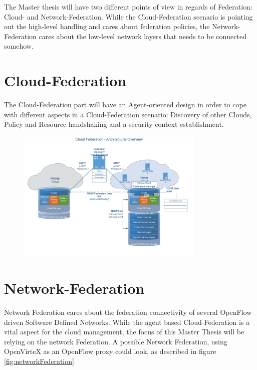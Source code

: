 \documentclass[a4paper,10pt]{article}
\begin{document}
The Master thesis will have two different points of view in regards of Federation: Cloud- and Network-Federation. While the Cloud-Federation scenario is pointing out the high-level handling and cares about federation policies, the Network-Federation cares about the low-level network layers that needs to be connected somehow.

\newpage
\section{Cloud-Federation}
The Cloud-Federation part will have an Agent-oriented design in order to cope with different aspects in a Cloud-Federation scenario: Discovery of other Clouds, Policy and Resource handshaking and a security context establishment.

\begin{figure}[h!]
 \centering
 \includegraphics[width=0.8\textwidth]{./gfx/cloudFederation.pdf}
 \label{fig:cloudFederation}
\end{figure}


\section{Network-Federation}
Network Federation cares about the federation connectivity of several OpenFlow driven Software Defined Networks. While the agent based Cloud-Federation is a vital aspect for the cloud management, the focus of this Master Thesis will be relying on the network Federation. A possible Network Federation, using OpenVirteX as an OpenFlow proxy could look, as described in figure \ref{fig:networkFederation}
\end{document}
